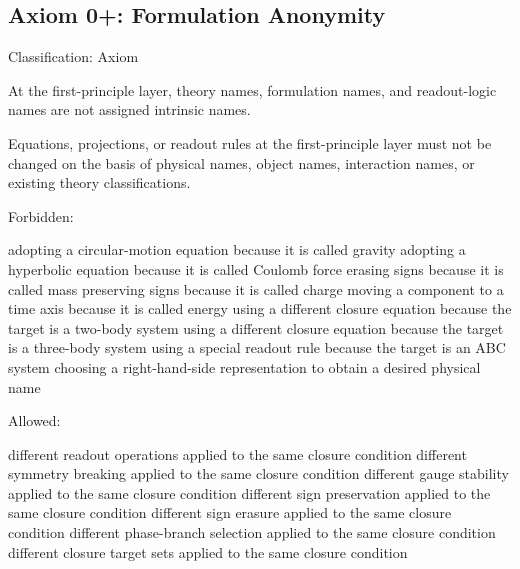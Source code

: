 \documentclass[
  a4paper]{article}
\newenvironment{Shaded}{}{}
\newcommand{\NormalTok}[1]{#1}
\begin{document}
\subsection{Axiom 0+: Formulation
Anonymity}\label{axiom-0-formulation-anonymity}

Classification: Axiom

At the first-principle layer, theory names, formulation names, and
readout-logic names are not assigned intrinsic names.

Equations, projections, or readout rules at the first-principle layer
must not be changed on the basis of physical names, object names,
interaction names, or existing theory classifications.

Forbidden:

\begin{Shaded}
\begin{Highlighting}[]
\NormalTok{adopting a circular{-}motion equation because it is called gravity}
\NormalTok{adopting a hyperbolic equation because it is called Coulomb force}
\NormalTok{erasing signs because it is called mass}
\NormalTok{preserving signs because it is called charge}
\NormalTok{moving a component to a time axis because it is called energy}
\NormalTok{using a different closure equation because the target is a two{-}body system}
\NormalTok{using a different closure equation because the target is a three{-}body system}
\NormalTok{using a special readout rule because the target is an ABC system}
\NormalTok{choosing a right{-}hand{-}side representation to obtain a desired physical name}
\end{Highlighting}
\end{Shaded}

Allowed:

\begin{Shaded}
\begin{Highlighting}[]
\NormalTok{different readout operations applied to the same closure condition}
\NormalTok{different symmetry breaking applied to the same closure condition}
\NormalTok{different gauge stability applied to the same closure condition}
\NormalTok{different sign preservation applied to the same closure condition}
\NormalTok{different sign erasure applied to the same closure condition}
\NormalTok{different phase{-}branch selection applied to the same closure condition}
\NormalTok{different closure target sets applied to the same closure condition}
\end{Highlighting}
\end{Shaded}
\end{document}
